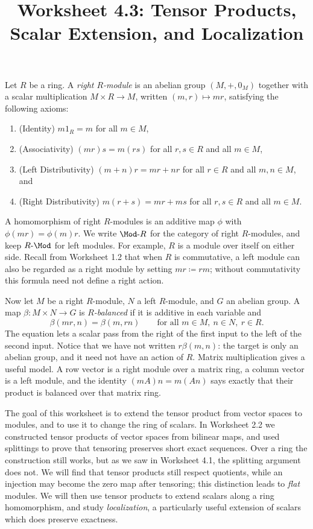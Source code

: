 \documentclass[12pt,reqno]{amsart}
\title{Worksheet 4.3: Tensor Products, Scalar Extension, and Localization}
\begin{document}
\maketitle
\thispagestyle{firstpage}

Let $R$ be a ring. A \emph{right $R$-module} is an abelian group $(M,+,0_M)$ together with a scalar multiplication $M\times R\to M$, written $(m,r)\mapsto mr$, satisfying the following axioms:
\begin{enumerate}[label=(\roman*)]
\item (Identity) $m1_R=m$ for all $m\in M$,
\item (Associativity) $(mr)s=m(rs)$ for all $r,s\in R$ and all $m\in M$,
\item (Left Distributivity) $(m+n)r=mr+nr$ for all $r\in R$ and all $m,n\in M$, and
\item (Right Distributivity) $m(r+s)=mr+ms$ for all $r,s\in R$ and all $m\in M$.
\end{enumerate}
A homomorphism of right $R$-modules is an additive map $\phi$ with $\phi(mr)=\phi(m)r$. We write $\Mod\text{-}R$ for the category of right $R$-modules, and keep $R\text{-}\Mod$ for left modules. For example, $R$ is a module over itself on either side. Recall from Worksheet 1.2 that when $R$ is commutative, a left module can also be regarded as a right module by setting $mr\coloneqq rm$; without commutativity this formula need not define a right action.

Now let $M$ be a right $R$-module, $N$ a left $R$-module, and $G$ an abelian group. A map $\beta:M\times N\to G$ is \emph{$R$-balanced} if it is additive in each variable and
\[
\beta(mr,n)=\beta(m,rn)\qquad\text{for all }m\in M,\ n\in N,\ r\in R.
\]
The equation lets a scalar pass from the right of the first input to the left of the second input. Notice that we have not written $r\beta(m,n)$: the target is only an abelian group, and it need not have an action of $R$. Matrix multiplication gives a useful model. A row vector is a right module over a matrix ring, a column vector is a left module, and the identity $(mA)n=m(An)$ says exactly that their product is balanced over that matrix ring.

The goal of this worksheet is to extend the tensor product from vector spaces to modules, and to use it to change the ring of scalars. In Worksheet 2.2 we constructed tensor products of vector spaces from bilinear maps, and used splittings to prove that tensoring preserves short exact sequences. Over a ring the construction still works, but as we saw in Worksheet 4.1, the splitting argument does not. We will find that tensor products still respect quotients, while an injection may become the zero map after tensoring; this distinction leads to \emph{flat} modules. We will then use tensor products to extend scalars along a ring homomorphism, and study \emph{localization}, a particularly useful extension of scalars which does preserve exactness.
\end{document}
